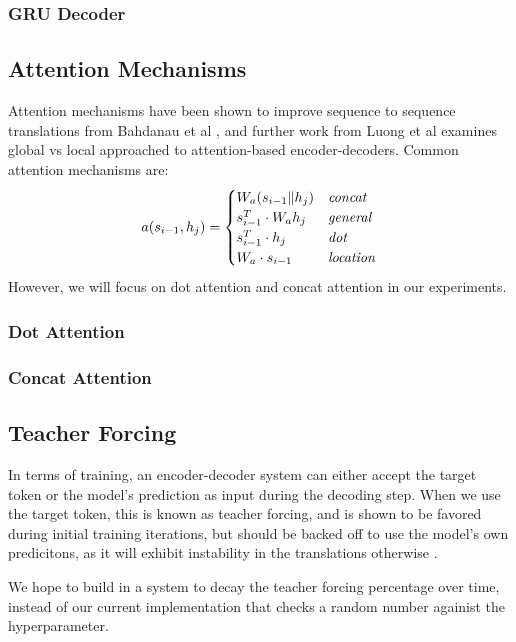 \documentclass[twoside,twocolumn]{article}
\begin{document}
\subsubsection{GRU Decoder}

\subsection{Attention Mechanisms}
Attention mechanisms have been shown to improve sequence to sequence
translations from Bahdanau et al \cite{bahdanau2014neural}, and further work
from Luong et al \cite{luong2015effective} examines global vs local approached
to attention-based encoder-decoders. Common attention mechanisms are:
\begin{equation}
    a(s_{i-1}, h_j) =
    \begin{cases}
        W_a (s_{i-1} \| h_j) & \text{\emph{concat}} \\
        s_{i-1}^T \cdot W_a h_j & \text{\emph{general}} \\
        s_{i-1}^T \cdot h_j & \text{\emph{dot}} \\
        W_a \cdot s_{i-1} & \text{\emph{location}}
    \end{cases}
\end{equation}
However, we will focus on dot attention and concat attention in our
experiments.
\subsubsection{Dot Attention}
\subsubsection{Concat Attention}

\subsection{Teacher Forcing}
In terms of training, an encoder-decoder system can either accept the target
token or the model's prediction as input during the decoding step. When we use
the target token, this is known as teacher forcing, and is shown to be favored
during initial training iterations, but should be backed off to use the
model's own predicitons, as it will exhibit instability in the translations
otherwise \cite{lamb2016professor}.

We hope to build in a system to decay the teacher forcing percentage over time,
instead of our current implementation that checks a random number againist the
hyperparameter.
\end{document}
